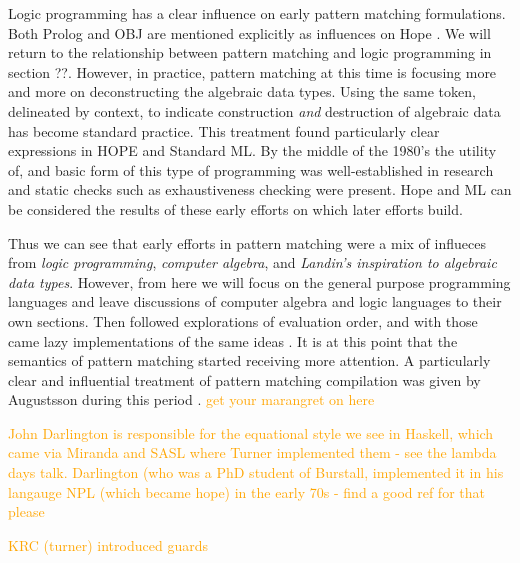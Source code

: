 \documentclass[acmsmall]{acmart}
\renewcommand\todo[1]{\textcolor{orange}{#1}}
\begin{document}
Logic programming has a clear influence on early pattern matching formulations.  Both Prolog and OBJ are mentioned explicitly as influences on Hope \cite{burstall_hope_1980}.  We will return to the relationship between pattern matching and logic programming in section ??.   However, in practice, pattern matching at this time is focusing more and more on  deconstructing the algebraic data types.  Using the same token, delineated by context, to indicate construction \emph{and} destruction of algebraic data has become standard practice.  This treatment found particularly clear expressions in HOPE\cite{burstall_hope_1980} and Standard ML\cite{milner_proposal_1984}.  By the middle of the 1980's the utility of, and basic form of this type of programming was well-established in research and static checks such as exhaustiveness checking were present.  Hope and ML can be considered the results of these early efforts on which later efforts build.

Thus we can see that early efforts in pattern matching were a mix of influeces from \emph{logic programming}, \emph{computer algebra}, and \emph{Landin's inspiration to algebraic data types}.  However, from here we will focus on the general purpose programming languages and leave discussions of computer algebra and logic languages to their own sections.
Then followed explorations of evaluation order, and with those came lazy implementations of the same ideas \cite{augustsson_compiler_1984}.  It is at this point that the semantics of pattern matching started receiving more attention.  A particularly clear and influential treatment of pattern matching compilation was given by Augustsson during this period \cite{augustsson_compiling_1985}. \todo{get your marangret on here}

\todo{John Darlington is responsible for the equational style we see in Haskell, which came via Miranda and SASL where Turner implemented them - see the lambda days talk.  Darlington (who was a PhD student of Burstall, implemented it in his langauge NPL (which became hope) in the early 70s - find a good ref for that please}

\todo{KRC (turner) introduced guards}
\end{document}
